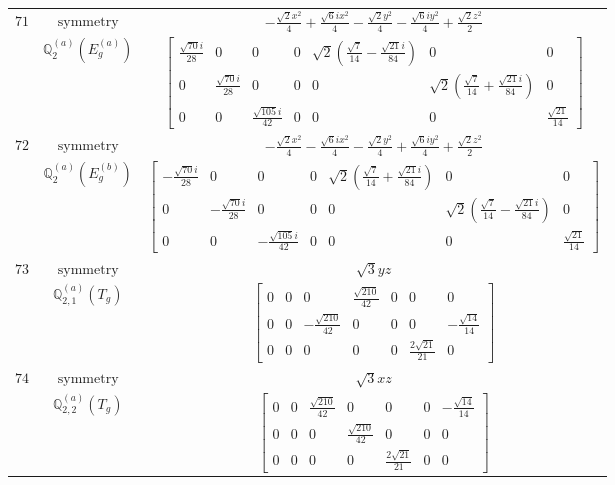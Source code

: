 \documentclass[fleqn,8pt,landscape]{jsarticle}
\begin{document}
\begin{longtable}{ccc}
$ 71 $ & $ \text{symmetry} $ & $ - \frac{\sqrt{2} x^{2}}{4} + \frac{\sqrt{6} i x^{2}}{4} - \frac{\sqrt{2} y^{2}}{4} - \frac{\sqrt{6} i y^{2}}{4} + \frac{\sqrt{2} z^{2}}{2} $ \\
$  $ & $ \mathbb{Q}_{2}^{(a)}(E_{g}^{(a)}) $ & $ \begin{bmatrix} \frac{\sqrt{70} i}{28} & 0 & 0 & 0 & \sqrt{2} \left(\frac{\sqrt{7}}{14} - \frac{\sqrt{21} i}{84}\right) & 0 & 0 \\ 0 & \frac{\sqrt{70} i}{28} & 0 & 0 & 0 & \sqrt{2} \left(\frac{\sqrt{7}}{14} + \frac{\sqrt{21} i}{84}\right) & 0 \\ 0 & 0 & \frac{\sqrt{105} i}{42} & 0 & 0 & 0 & \frac{\sqrt{21}}{14} \end{bmatrix} $ \\ \hline
$ 72 $ & $ \text{symmetry} $ & $ - \frac{\sqrt{2} x^{2}}{4} - \frac{\sqrt{6} i x^{2}}{4} - \frac{\sqrt{2} y^{2}}{4} + \frac{\sqrt{6} i y^{2}}{4} + \frac{\sqrt{2} z^{2}}{2} $ \\
$  $ & $ \mathbb{Q}_{2}^{(a)}(E_{g}^{(b)}) $ & $ \begin{bmatrix} - \frac{\sqrt{70} i}{28} & 0 & 0 & 0 & \sqrt{2} \left(\frac{\sqrt{7}}{14} + \frac{\sqrt{21} i}{84}\right) & 0 & 0 \\ 0 & - \frac{\sqrt{70} i}{28} & 0 & 0 & 0 & \sqrt{2} \left(\frac{\sqrt{7}}{14} - \frac{\sqrt{21} i}{84}\right) & 0 \\ 0 & 0 & - \frac{\sqrt{105} i}{42} & 0 & 0 & 0 & \frac{\sqrt{21}}{14} \end{bmatrix} $ \\ \hline
$ 73 $ & $ \text{symmetry} $ & $ \sqrt{3} y z $ \\
$  $ & $ \mathbb{Q}_{2,1}^{(a)}(T_{g}) $ & $ \begin{bmatrix} 0 & 0 & 0 & \frac{\sqrt{210}}{42} & 0 & 0 & 0 \\ 0 & 0 & - \frac{\sqrt{210}}{42} & 0 & 0 & 0 & - \frac{\sqrt{14}}{14} \\ 0 & 0 & 0 & 0 & 0 & \frac{2 \sqrt{21}}{21} & 0 \end{bmatrix} $ \\ \hline
$ 74 $ & $ \text{symmetry} $ & $ \sqrt{3} x z $ \\
$  $ & $ \mathbb{Q}_{2,2}^{(a)}(T_{g}) $ & $ \begin{bmatrix} 0 & 0 & \frac{\sqrt{210}}{42} & 0 & 0 & 0 & - \frac{\sqrt{14}}{14} \\ 0 & 0 & 0 & \frac{\sqrt{210}}{42} & 0 & 0 & 0 \\ 0 & 0 & 0 & 0 & \frac{2 \sqrt{21}}{21} & 0 & 0 \end{bmatrix} $ \\ \hline

\end{longtable}
\end{document}
